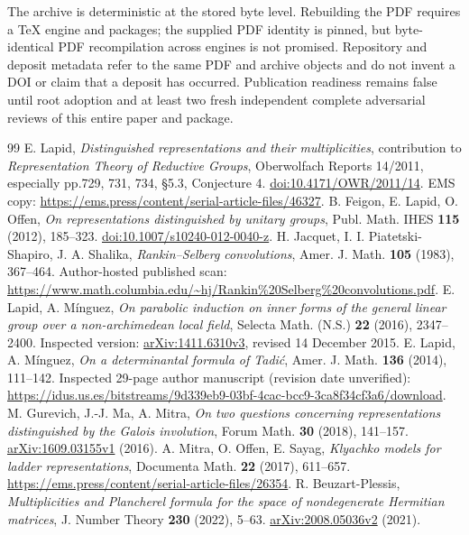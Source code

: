 \documentclass[11pt]{article}
\begin{document}
The archive is deterministic at the stored byte level. Rebuilding the PDF requires a TeX engine and packages; the supplied PDF identity is pinned, but byte-identical PDF recompilation across engines is not promised. Repository and deposit metadata refer to the same PDF and archive objects and do not invent a DOI or claim that a deposit has occurred. Publication readiness remains false until root adoption and at least two fresh independent complete adversarial reviews of this entire paper and package.

\begin{thebibliography}{99}\small
{} E. Lapid, \emph{Distinguished representations and their multiplicities}, contribution to \emph{Representation Theory of Reductive Groups}, Oberwolfach Reports 14/2011, especially pp.729, 731, 734, \S5.3, Conjecture 4. \href{https://doi.org/10.4171/OWR/2011/14}{doi:10.4171/OWR/2011/14}. EMS copy: \url{https://ems.press/content/serial-article-files/46327}.
 B. Feigon, E. Lapid, O. Offen, \emph{On representations distinguished by unitary groups}, Publ. Math. IHES \textbf{115} (2012), 185--323. \href{https://doi.org/10.1007/s10240-012-0040-z}{doi:10.1007/s10240-012-0040-z}.
 H. Jacquet, I. I. Piatetski-Shapiro, J. A. Shalika, \emph{Rankin--Selberg convolutions}, Amer. J. Math. \textbf{105} (1983), 367--464. Author-hosted published scan: \url{https://www.math.columbia.edu/~hj/Rankin\%20Selberg\%20convolutions.pdf}.
 E. Lapid, A. M\'inguez, \emph{On parabolic induction on inner forms of the general linear group over a non-archimedean local field}, Selecta Math. (N.S.) \textbf{22} (2016), 2347--2400. Inspected version: \href{https://arxiv.org/abs/1411.6310v3}{arXiv:1411.6310v3}, revised 14 December 2015.
 E. Lapid, A. M\'inguez, \emph{On a determinantal formula of Tadi\'c}, Amer. J. Math. \textbf{136} (2014), 111--142. Inspected 29-page author manuscript (revision date unverified): \url{https://idus.us.es/bitstreams/9d339eb9-03bf-4cac-bcc9-3ca8f34cf3a6/download}.
 M. Gurevich, J.-J. Ma, A. Mitra, \emph{On two questions concerning representations distinguished by the Galois involution}, Forum Math. \textbf{30} (2018), 141--157. \href{https://arxiv.org/abs/1609.03155v1}{arXiv:1609.03155v1} (2016).
 A. Mitra, O. Offen, E. Sayag, \emph{Klyachko models for ladder representations}, Documenta Math. \textbf{22} (2017), 611--657. \url{https://ems.press/content/serial-article-files/26354}.
 R. Beuzart-Plessis, \emph{Multiplicities and Plancherel formula for the space of nondegenerate Hermitian matrices}, J. Number Theory \textbf{230} (2022), 5--63. \href{https://arxiv.org/abs/2008.05036v2}{arXiv:2008.05036v2} (2021).

\end{thebibliography}
\end{document}
